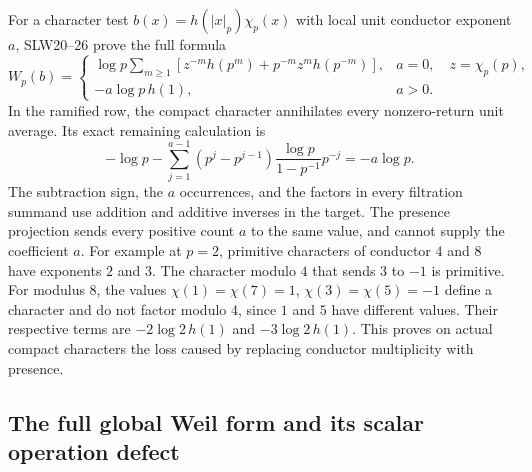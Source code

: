 For a character test
$b(x)=h(|x|_p)\chi_p(x)$ with local unit conductor exponent $a$,
SLW20--26 prove the full formula
\begin{equation}\tag{FTR16}\label{eq:FTR-conductor}
 W_p(b)=
 \begin{cases}
 \displaystyle\log p\sum_{m\geq1}
  [z^{-m}h(p^m)+p^{-m}z^m h(p^{-m})],&a=0,\quad z=\chi_p(p),\\
 -a\log p\,h(1),&a>0.
 \end{cases}
\end{equation}
In the ramified row, the compact character annihilates every
nonzero-return unit average. Its exact remaining calculation is
\begin{equation}\tag{FTR17}\label{eq:FTR-conductorcount}
 -\log p-\sum_{j=1}^{a-1}(p^j-p^{j-1})
             \frac{\log p}{1-p^{-1}}p^{-j}
       =-a\log p.
\end{equation}
The subtraction sign, the $a$ occurrences, and the factors in
every filtration summand use addition and additive inverses in
the target. The presence projection sends every positive count
$a$ to the same value, and cannot supply the coefficient $a$.
For example at $p=2$, primitive characters of conductor $4$
and $8$ have exponents $2$ and $3$. The character modulo $4$
that sends $3$ to $-1$ is primitive. For modulus $8$, the values
$\chi(1)=\chi(7)=1$, $\chi(3)=\chi(5)=-1$ define a character
and do not factor modulo $4$, since $1$ and $5$ have different
values. Their respective terms are
$-2\log2\,h(1)$ and $-3\log2\,h(1)$.
This proves on actual compact characters the loss caused by
replacing conductor multiplicity with presence.

\subsection{The full global Weil form and its scalar operation defect}

